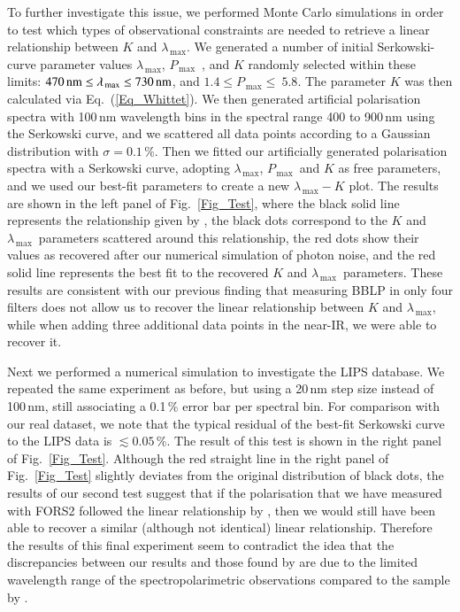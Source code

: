 \documentclass[a4paper]{aa}
\newcommand{\lmax}{\ensuremath{\lambda_\mathrm{\,max}}}
\newcommand{\pmax}{\ensuremath{P_\mathrm{\,max}}}
\begin{document}
To further investigate this issue, we performed Monte Carlo
simulations in order to test which types of observational constraints
are needed to retrieve a linear relationship between $K$ and \lmax.
We generated a number of initial Serkowski-curve
parameter values \lmax, \pmax\ , and $K$ randomly selected within these
limits: $470\,{\rm nm} \le \lmax \le 730\,{\rm nm}$, and $1.4 \le \pmax
\le\ 5.8$.  The parameter $K$ was then calculated via
Eq.~(\ref{Eq_Whittet}).  We then generated artificial polarisation
spectra with 100\,nm wavelength bins in the spectral range 400 to
900\,nm using the Serkowski curve, and we scattered all data points
according to a Gaussian distribution with $\sigma=0.1$\,\%.
 Then we fitted our artificially generated
polarisation spectra with a Serkowski curve, adopting \lmax, \pmax\ and
$K$ as free parameters, and we used our best-fit parameters to create
a new $\lmax-K$ plot. The results are shown in the left panel of Fig.~\ref{Fig_Test},
 where the black solid line represents the
relationship given by \citet{Whietal92}, the black dots correspond to
the $K$ and \lmax\ parameters scattered around this relationship, the
red dots show their values as recovered after our numerical simulation
of photon noise, and the red solid line represents the best fit to the
recovered $K$ and \lmax\ parameters. These results are consistent with
our previous finding that measuring BBLP in
only four filters does not allow us to recover the linear relationship
between $K$ and \lmax, while when adding three additional data points
in the near-IR, we were able to recover it.

Next we performed a numerical simulation to investigate the LIPS
database. We repeated the same experiment as before, but using a
20\,nm step size instead of 100\,nm, still associating a 0.1\,\% error
bar per spectral bin. For comparison with our real dataset, we note
that the typical residual of the best-fit Serkowski curve to the LIPS
data is $\lesssim 0.05$\,\%. The result of this test is shown in the
right panel of Fig.~\ref{Fig_Test}.  Although the red straight line in
the right panel of Fig.~\ref{Fig_Test} slightly deviates from the
original distribution of black dots, the results of our second test
suggest that if the polarisation that we have measured with FORS2
followed the linear relationship by \citet{Whietal92}, then we would still have been able to recover a similar (although not identical)
linear relationship.  Therefore the results of this final experiment
seem to contradict the idea that the discrepancies between our results
and those found by \citet{Whietal92} are due to the limited wavelength
range of the spectropolarimetric observations compared to the sample
by \citet{Whietal92}.
\end{document}

